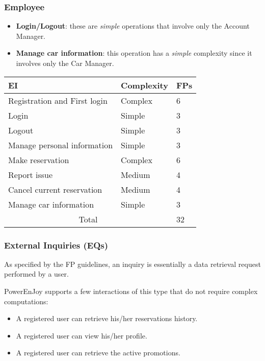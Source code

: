 \subsubsection*{Employee}
\begin{itemize}
	\item \textbf{Login/Logout}: these are \textit{simple} operations that involve only the Account Manager.
	\item \textbf{Manage car information}: this operation has a \textit{simple} complexity since it involves only the Car Manager.
\end{itemize}

\begin{table}[H]
	\centering
	\begin{tabular}{| m{5.5cm} | m{2.5cm} | m{1cm} |}
		\hline
		\textbf{EI} & \textbf{Complexity} & \textbf{FPs}\\
		\hline
		Registration and First login & Complex & 6\\
		Login & Simple & 3\\
		Logout & Simple & 3\\
		Manage personal information & Simple & 3\\
		Make reservation & Complex & 6\\
		Report issue & Medium & 4\\
		Cancel current reservation & Medium & 4\\
		Manage car information & Simple & 3\\
		\hline
		\multicolumn{2}{|c|}{Total} & 32\\
		\hline
	\end{tabular}
\end{table}

\subsubsection{External Inquiries (EQs)}
As specified by the FP guidelines, an inquiry is essentially a data retrieval request performed by a user.

PowerEnJoy supports a few interactions of this type that do not require complex computations:
\begin{itemize}
	\item A registered user can retrieve his/her reservations history.
	\item A registered user can view his/her profile.
	\item A registered user can retrieve the active promotions.
\end{itemize}

